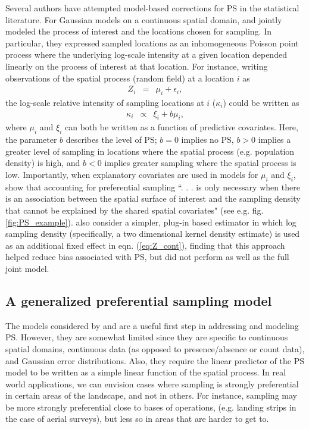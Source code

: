 \documentclass[times,mee,doublespace,]{besauth2}
\begin{document}
Several authors have attempted model-based corrections for PS in the statistical literature. For Gaussian models on a continuous spatial domain, \citet{DiggleEtAl2010} and \citet{PatiEtAl2011} jointly modeled the process of interest and the locations chosen for sampling.  In particular, they expressed sampled locations as an inhomogeneous Poisson point process where the underlying log-scale intensity at a given location depended linearly on the process of interest at that location.  For instance, writing observations of the spatial process (random field) at a location $i$ as
\begin{eqnarray}
   Z_i & = & \mu_i + \epsilon_i,
   \label{eq:Z_cont}
\end{eqnarray}
the log-scale relative intensity of sampling locations at $i$ ($\kappa_i$) could be written as
\begin{eqnarray}
   \kappa_i & \propto & \xi_i + b \mu_i,
   \label{eq:p_cont}
\end{eqnarray}
where $\mu_i$ and $\xi_i$ can both be written as a function of predictive covariates.
Here, the parameter $b$ describes the level of PS; $b=0$ implies no PS, $b>0$ implies a greater level of sampling in locations where the spatial process (e.g. population density) is high, and $b<0$ implies greater sampling where the spatial process is low.  Importantly, when explanatory covariates are used in models for $\mu_i$ and $\xi_i$, \citet{PatiEtAl2011} show that accounting for preferential sampling  ``. . . is only necessary when there
is an association between the spatial surface of interest and the sampling density that cannot be
explained by the shared spatial covariates" (see e.g. fig. \ref{fig:PS_example}).    \citet{PatiEtAl2011} also consider a simpler, plug-in based estimator in which log sampling density (specifically, a two dimensional kernel density estimate) is used as an additional fixed effect in eqn. (\ref{eq:Z_cont}), finding that this approach helped reduce bias associated with PS, but did not perform as well as the full joint model.

\subsection{A generalized preferential sampling model}

The models considered by \citet{DiggleEtAl2010} and \citet{PatiEtAl2011} are a useful first step in addressing and modeling PS.  However, they are somewhat limited since they are specific to continuous spatial domains, continuous data (as opposed to presence/absence or count data), and Gaussian error distributions.  Also, they require the linear predictor of the PS model to be written as a simple linear function of the spatial process.  In real world applications, we can envision cases where sampling is strongly preferential in certain areas of the landscape, and not in others.  For instance, sampling may be more strongly preferential close to bases of operations, (e.g. landing strips in the case of aerial surveys), but less so in areas that are harder to get to.
\end{document}
